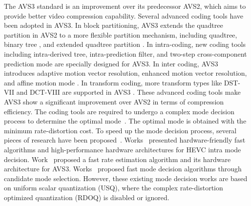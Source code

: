 \documentclass[lettersize,journal]{IEEEtran}
\begin{document}
The AVS3 standard is an improvement over its predecessor AVS2, which aims to provide better video compression capability. Several advanced coding tools have been adopted in AVS3. In block partitioning, AVS3 extends the quadtree partition in AVS2 to a more flexible partition mechanism, including quadtree, binary tree \cite{huang2019vvcbt}, and extended quadtree partition \cite{wang2019extendedpartition}. In intra-coding, new coding tools including intra-derived tree, intra-prediction filter, and two-step cross-component prediction mode are specially designed for AVS3. In inter coding, AVS3 introduces adaptive motion vector resolution, enhanced motion vector resolution, and affine motion mode \cite{fan2020avs3codingtools}. In transform coding, more transform types like DST-VII and DCT-VIII are supported in AVS3 \cite{avs3standard}. These advanced coding tools make AVS3 show a significant improvement over AVS2 in terms of compression efficiency. The coding tools are required to undergo a complex mode decision process to determine the optimal mode~\cite{jamali2018fast}. The optimal mode is obtained with the minimum rate-distortion cost. To speed up the mode decision process, several pieces of research have been proposed~\cite{pastuszak2015algorithm, zhang2019high, yan2022efficient, sainio2023rdo, liu2023deep}. Works~\cite{pastuszak2015algorithm, zhang2019high} presented hardware-friendly fast algorithms and high-performance hardware architectures for HEVC intra mode decision. Work~\cite{yan2022efficient} proposed a fast rate estimation algorithm and its hardware architecture for AVS3. Works~\cite{sainio2023rdo,liu2023deep} proposed fast mode decision algorithms through candidate mode selection. However, these existing mode decision works are based on uniform scalar quantization (USQ), where the complex rate-distortion optimized quantization (RDOQ) is disabled or ignored. 

\IEEEpubidadjcol

\end{document}
